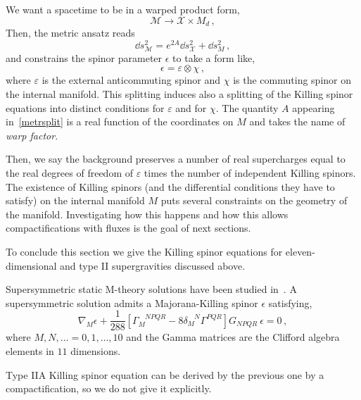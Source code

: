 \documentclass[debug]{phd}
\begin{document}
				We want a spacetime to be in a warped product form,
						\begin{equation*}
							\mathcal{M} \rightarrow \mathcal{X} \times M_d\, ,
						\end{equation*}
				Then, the metric ansatz reads
						\begin{equation}\label{metrsplit}
							\dd s^2_{\mathcal{M}} = e^{2A}\dd s^2_{\mathcal{X}} + \dd s^2_{M} \, ,
						\end{equation}
				and constrains the spinor parameter $\epsilon$ to take a form like,
						\begin{equation}
							\epsilon = \varepsilon \otimes \chi \, ,
						\end{equation}
				where $\varepsilon$ is the external anticommuting spinor and $\chi$ is the commuting spinor on the internal manifold.
				This splitting induces also a splitting of the Killing spinor equations into distinct conditions for $\varepsilon$ and for $\chi$.
				The quantity $A$ appearing in~\eqref{metrsplit} is a real function of the coordinates on $M$ and takes the name of \emph{warp factor}.
				
				Then, we say the background preserves a number of real supercharges equal to the real degrees of freedom of $\varepsilon$ times the number of independent Killing spinors.
				The existence of Killing spinors (and the differential conditions they have to satisfy) on the internal manifold $M$ puts several constraints on the geometry of the manifold. 
				Investigating how this happens and how this allows compactifications with fluxes is the goal of next sections.
				
				To conclude this section we give the Killing spinor equations for eleven-dimensional and type II supergravities discussed above.
				
				Supersymmetric static M-theory solutions have been studied in~\cite{GauntlettGeomKill}. 
				A supersymmetric solution admits a Majorana-Killing spinor $\epsilon$ satisfying,
						\begin{equation}
							\nabla_M \epsilon + \frac{1}{288} \left[ \Gamma_M^{\phantom{M}NPQR} - 8 \delta_M^{\phantom{M}N} \Gamma^{PQR} \right] G_{NPQR}\ \epsilon =0 \, ,
						\end{equation}
				where $M,N, \ldots = 0,1, \dots, 10$ and the Gamma matrices are the Clifford algebra elements in $11$ dimensions. 
				
				Type IIA Killing spinor equation can be derived by the previous one by a compactification, so we do not give it explicitly.
				
\end{document}
